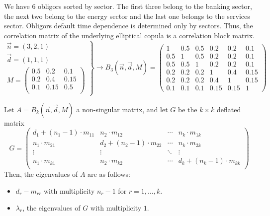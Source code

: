 \documentclass[11pt,fleqn]{book} %
\begin{document}
\begin{example}
	\label{example1}
	We have $6$ obligors sorted by sector. The first three belong to the 
	banking sector, the next two belong to the energy sector 
	and the last one belongs to the services sector. Obligors default time
	dependence is determined only by sectors. Thus, the correlation matrix 
	of the underlying elliptical copula is a correlation block matrix.
	\small
	\begin{displaymath}
		\left.
		\begin{array}{l}
			\vec{n} = \left(3,2,1\right) \\
			\vec{d} = \left(1,1,1\right) \\
			M = \left(
			\begin{array}{ccc}
				0.5 & 0.2  & 0.1  \\
				0.2 & 0.4  & 0.15 \\
				0.1 & 0.15 & 0.5  \\
			\end{array}
			\right)
		\end{array}
		\right\}
		\rightarrow
		B_3(\vec{n},\vec{d},M)=
		\left(
		\begin{array}{ccc|cc|c} 
			1   & 0.5 & 0.5 & 0.2  & 0.2  & 0.1  \\ 
			0.5 & 1   & 0.5 & 0.2  & 0.2  & 0.1  \\ 
			0.5 & 0.5 & 1   & 0.2  & 0.2  & 0.1  \\ 
			\hline
			0.2 & 0.2 & 0.2 & 1    & 0.4  & 0.15 \\ 
			0.2 & 0.2 & 0.2 & 0.4  & 1    & 0.15 \\ 
			\hline
			0.1 & 0.1 & 0.1 & 0.15 & 0.15 & 1    
		\end{array} 
		\right)
	\end{displaymath}
\end{example}

\begin{proposition}
	\label{prop1}
	Let $A = B_k(\vec{n}, \vec{d}, M)$ a non-singular matrix, and let $G$ be 
	the $k {\times} k$ deflated matrix
	\begin{displaymath}
		G =
		\left( \begin{array}{cccc}
		d_1+(n_1-1)\cdot m_{11} & n_2 \cdot m_{12}        & \cdots & n_k \cdot m_{1k} \\
		n_1\cdot m_{21}         & d_2+(n_2-1)\cdot m_{22} & \cdots & n_k \cdot m_{2k} \\
		\vdots                  & \vdots                  & \ddots & \vdots \\
		n_1\cdot m_{k1}         & n_2 \cdot m_{k2}        & \cdots & d_k+(n_k-1)\cdot m_{kk} \\
		\end{array} \right)
	\end{displaymath}
	Then, the eigenvalues of $A$ are as follows:
	\begin{itemize}
		\item $d_{r}-m_{rr}$ with multiplicity $n_r-1$ for $r=1,\dots,k$.
		\item $\lambda_r$, the eigenvalues of $G$ with multiplicity $1$.
	\end{itemize}
\end{proposition}
\end{document}

